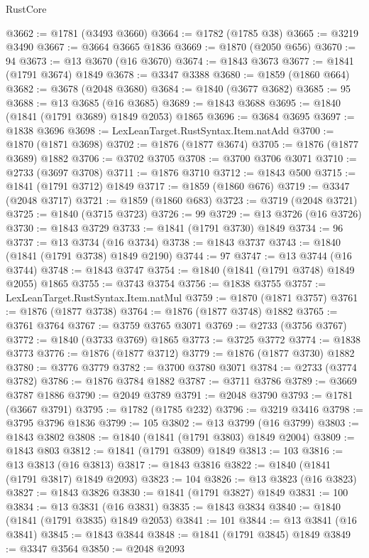 \begin{lexlean}{RustCore}
\begin{coremodule}
@3662 := @1781 (@3493 @3660)
@3664 := @1782 (@1785 @38)
@3665 := @3219 @3490
@3667 := @3664 @3665 @1836
@3669 := @1870 (@2050 @656)
@3670 := 94
@3673 := @13 @3670 (@16 @3670)
@3674 := @1843 @3673
@3677 := @1841 (@1791 @3674) @1849
@3678 := @3347 @3388
@3680 := @1859 (@1860 @664)
@3682 := @3678 (@2048 @3680)
@3684 := @1840 (@3677 @3682)
@3685 := 95
@3688 := @13 @3685 (@16 @3685)
@3689 := @1843 @3688
@3695 := @1840 (@1841 (@1791 @3689) @1849 @2053) @1865
@3696 := @3684 @3695
@3697 := @1838 @3696
@3698 := LexLeanTarget.RustSyntax.Item.natAdd
@3700 := @1870 (@1871 @3698)
@3702 := @1876 (@1877 @3674)
@3705 := @1876 (@1877 @3689) @1882
@3706 := @3702 @3705
@3708 := @3700 @3706 @3071
@3710 := @2733 (@3697 @3708)
@3711 := @1876 @3710
@3712 := @1843 @500
@3715 := @1841 (@1791 @3712) @1849
@3717 := @1859 (@1860 @676)
@3719 := @3347 (@2048 @3717)
@3721 := @1859 (@1860 @683)
@3723 := @3719 (@2048 @3721)
@3725 := @1840 (@3715 @3723)
@3726 := 99
@3729 := @13 @3726 (@16 @3726)
@3730 := @1843 @3729
@3733 := @1841 (@1791 @3730) @1849
@3734 := 96
@3737 := @13 @3734 (@16 @3734)
@3738 := @1843 @3737
@3743 := @1840 (@1841 (@1791 @3738) @1849 @2190)
@3744 := 97
@3747 := @13 @3744 (@16 @3744)
@3748 := @1843 @3747
@3754 := @1840 (@1841 (@1791 @3748) @1849 @2055) @1865
@3755 := @3743 @3754
@3756 := @1838 @3755
@3757 := LexLeanTarget.RustSyntax.Item.natMul
@3759 := @1870 (@1871 @3757)
@3761 := @1876 (@1877 @3738)
@3764 := @1876 (@1877 @3748) @1882
@3765 := @3761 @3764
@3767 := @3759 @3765 @3071
@3769 := @2733 (@3756 @3767)
@3772 := @1840 (@3733 @3769) @1865
@3773 := @3725 @3772
@3774 := @1838 @3773
@3776 := @1876 (@1877 @3712)
@3779 := @1876 (@1877 @3730) @1882
@3780 := @3776 @3779
@3782 := @3700 @3780 @3071
@3784 := @2733 (@3774 @3782)
@3786 := @1876 @3784 @1882
@3787 := @3711 @3786
@3789 := @3669 @3787 @1886
@3790 := @2049 @3789
@3791 := @2048 @3790
@3793 := @1781 (@3667 @3791)
@3795 := @1782 (@1785 @232)
@3796 := @3219 @3416
@3798 := @3795 @3796 @1836
@3799 := 105
@3802 := @13 @3799 (@16 @3799)
@3803 := @1843 @3802
@3808 := @1840 (@1841 (@1791 @3803) @1849 @2004)
@3809 := @1843 @803
@3812 := @1841 (@1791 @3809) @1849
@3813 := 103
@3816 := @13 @3813 (@16 @3813)
@3817 := @1843 @3816
@3822 := @1840 (@1841 (@1791 @3817) @1849 @2093)
@3823 := 104
@3826 := @13 @3823 (@16 @3823)
@3827 := @1843 @3826
@3830 := @1841 (@1791 @3827) @1849
@3831 := 100
@3834 := @13 @3831 (@16 @3831)
@3835 := @1843 @3834
@3840 := @1840 (@1841 (@1791 @3835) @1849 @2053)
@3841 := 101
@3844 := @13 @3841 (@16 @3841)
@3845 := @1843 @3844
@3848 := @1841 (@1791 @3845) @1849
@3849 := @3347 @3564
@3850 := @2048 @2093

\end{coremodule}
\end{lexlean}

